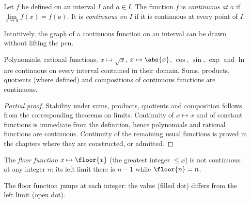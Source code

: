 \begin{definition}[Continuity]\label{def:tle:limcont:continuity}
Let $f$ be defined on an interval $I$ and $a \in I$. The function $f$ is
\emph{continuous at $a$} if
$\lim\limits_{x \to a} f(x) = f(a)$. It is \emph{continuous on $I$} if it is
continuous at every point of $I$.
\end{definition}

Intuitively, the graph of a continuous function on an interval can be drawn
without lifting the pen.

\begin{proposition}\label{prop:tle:limcont:usual}
Polynomials, rational functions, $x \mapsto \sqrt{x}$, $x \mapsto \abs{x}$,
$\cos$, $\sin$, $\exp$ and $\ln$ are continuous on every interval contained
in their domain. Sums, products, quotients (where defined) and compositions
of continuous functions are continuous.
\end{proposition}

\begin{proof}[Partial proof]
Stability under sums, products, quotients and composition follows from the
corresponding theorems on limits. Continuity of $x \mapsto x$ and of constant
functions is immediate from the definition, hence polynomials and rational
functions are continuous. Continuity of the remaining usual functions is
proved in the chapters where they are constructed, or admitted.
\end{proof}

\begin{example}
The \emph{floor function} $x \mapsto \floor{x}$ (the greatest integer
$\leq x$) is not continuous at any integer $n$: its left limit there is
$n - 1$ while $\floor{n} = n$.
\end{example}

\begin{omfigure}

{\small The floor function jumps at each integer: the value (filled dot)
differs from the left limit (open dot).}
\end{omfigure}

